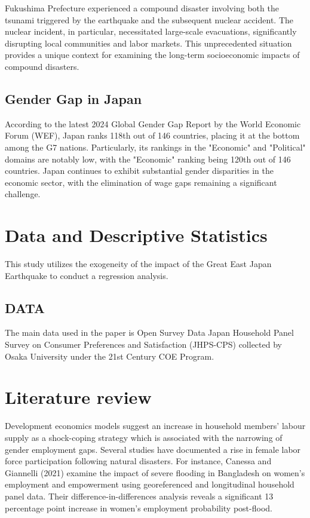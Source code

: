 \documentclass[12pt,halfline,a4paper]{ouparticle}
\begin{document}
Fukushima Prefecture experienced a compound disaster involving both the tsunami triggered by the earthquake and the subsequent nuclear accident. The nuclear incident, in particular, necessitated large-scale evacuations, significantly disrupting local communities and labor markets. This unprecedented situation provides a unique context for examining the long-term socioeconomic impacts of compound disasters.


\subsection{Gender Gap in Japan}
\label{sec5.1}

According to the latest 2024 Global Gender Gap Report by the World Economic Forum (WEF), Japan ranks 118th out of 146 countries, placing it at the bottom among the G7 nations. Particularly, its rankings in the "Economic" and "Political" domains are notably low, with the "Economic" ranking being 120th out of 146 countries. Japan continues to exhibit substantial gender disparities in the economic sector, with the elimination of wage gaps remaining a significant challenge.

\section{Data and Descriptive Statistics}
\label{sec4}

This study utilizes the exogeneity of the impact of the Great East Japan Earthquake to conduct a regression analysis. 

\subsection{DATA}
\label{sec5.1}

The main data used in the paper is Open Survey Data Japan Household Panel Survey on Consumer Preferences and Satisfaction (JHPS-CPS) collected by Osaka University under the 21st Century COE Program.


\section{Literature review}
\label{sec3}



Development economics models suggest an increase in household members’ labour supply as a shock-coping strategy which is associated with the narrowing of gender employment gaps. Several studies have documented a rise in female labor force participation following natural disasters. For instance, Canessa and Giannelli (2021)\cite{Canessa2021WomensShocks} examine the impact of severe flooding in Bangladesh on women's employment and empowerment using georeferenced and longitudinal household panel data. Their difference-in-differences analysis reveals a significant 13 percentage point increase in women's employment probability post-flood. 
\end{document}
